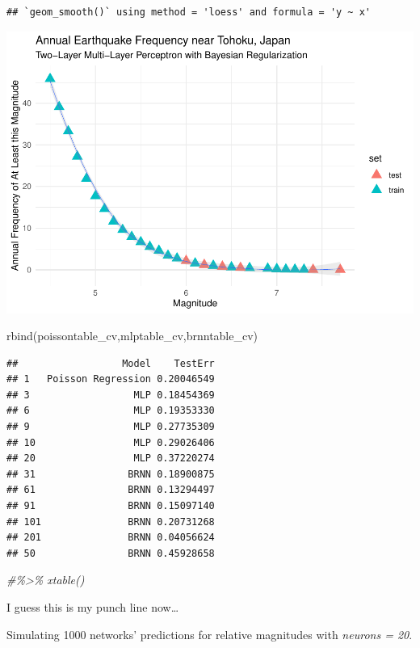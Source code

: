 \documentclass[
]{article}
\newenvironment{Shaded}{\begin{snugshade}}{\end{snugshade}}
\newcommand{\CommentTok}[1]{\textcolor[rgb]{0.56,0.35,0.01}{\textit{#1}}}
\newcommand{\FunctionTok}[1]{\textcolor[rgb]{0.00,0.00,0.00}{#1}}
\newcommand{\NormalTok}[1]{#1}
\begin{document}
\begin{verbatim}
## `geom_smooth()` using method = 'loess' and formula = 'y ~ x'
\end{verbatim}

\includegraphics{Appendix_eq_files/figure-latex/unnamed-chunk-14-1.pdf}

\begin{Shaded}
\begin{Highlighting}[]
\FunctionTok{rbind}\NormalTok{(poissontable\_cv,mlptable\_cv,brnntable\_cv)}
\end{Highlighting}
\end{Shaded}

\begin{verbatim}
##                  Model    TestErr
## 1   Poisson Regression 0.20046549
## 3                  MLP 0.18454369
## 6                  MLP 0.19353330
## 9                  MLP 0.27735309
## 10                 MLP 0.29026406
## 20                 MLP 0.37220274
## 31                BRNN 0.18900875
## 61                BRNN 0.13294497
## 91                BRNN 0.15097140
## 101               BRNN 0.20731268
## 201               BRNN 0.04056624
## 50                BRNN 0.45928658
\end{verbatim}

\begin{Shaded}
\begin{Highlighting}[]
\CommentTok{\#\%\textgreater{}\% xtable()}
\end{Highlighting}
\end{Shaded}

I guess this is my punch line now\ldots{}

Simulating 1000 networks' predictions for relative magnitudes with
\emph{neurons = 20}.
\end{document}
